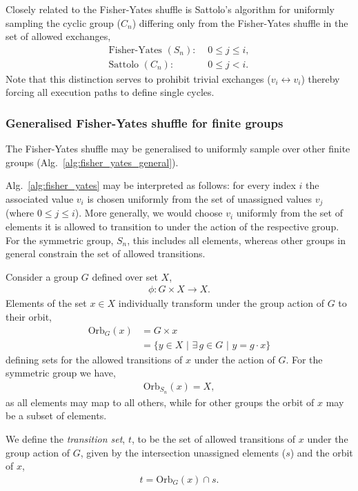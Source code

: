 Closely related to the Fisher-Yates shuffle is Sattolo's algorithm \cite{Sattolo86} for uniformly sampling the cyclic group ($C_n$) differing only from the Fisher-Yates shuffle in the set of allowed exchanges,
\begin{align}
	\text{Fisher-Yates }(S_n):\,\, & 0\leq j\leq i,\nonumber \\
	\text{Sattolo }(C_n):\,\,      & 0\leq j<i.
\end{align}
Note that this distinction serves to prohibit trivial exchanges ($v_i\leftrightarrow v_i$) thereby forcing all execution paths to define single cycles.

\subsubsection{Generalised Fisher-Yates shuffle for finite groups}

The Fisher-Yates shuffle may be generalised to uniformly sample over other finite groups (Alg.~\ref{alg:fisher_yates_general}).

Alg.~\ref{alg:fisher_yates} may be interpreted as follows: for every index $i$ the associated value $v_i$ is chosen uniformly from the set of unassigned values $v_j$ (where $0\leq j\leq i$). More generally, we would choose $v_i$ uniformly from the set of elements it is allowed to transition to under the action of the respective group. For the symmetric group, $S_n$, this includes all elements, whereas other groups in general constrain the set of allowed transitions.

Consider a group $G$ defined over set $X$,
\begin{align}
	\phi: G\times X \to X.
\end{align}
Elements of the set $x\in X$ individually transform under the group action of $G$ to their orbit,
\begin{align}
	\mathrm{Orb}_G(x) & = G\times x \nonumber                                         \\
	                  & = \{ y\in X \,\,|\,\, \exists \,g\in G \,\,|\,\, y=g\cdot x\}
\end{align}
defining sets for the allowed transitions of $x$ under the action of $G$. For the symmetric group we have,
\begin{align}
	\mathrm{Orb}_{S_n}(x) = X,
\end{align}
as all elements may map to all others, while for other groups the orbit of $x$ may be a subset of elements.

We define the \emph{transition set}, $t$, to be the set of allowed transitions of $x$ under the group action of $G$, given by the intersection unassigned elements ($s$) and the orbit of $x$,
\begin{align}
	t = \mathrm{Orb}_G(x) \cap s.
\end{align}

